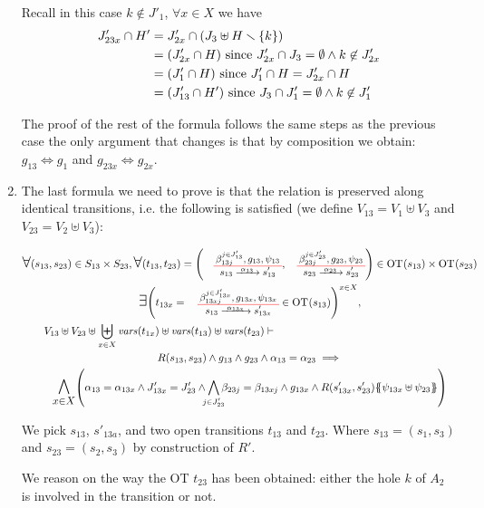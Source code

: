 \documentclass[runningheads]{llncs}
\begin{document}
\begin{enumerate}
Recall in this case $k \notin J'_1$, $\forall x \in X$ we have
\begin{align*}		
J'_{23x} \cap H' & = J'_{2x}  \cap {\left(J_3 \uplus H \smallsetminus{\left\{k\right\}}\right)} \\
& = {\left(J'_{2x}\cap H \right)} \text{ since } J'_{2x}\cap J_3=\emptyset \land k\not\in J'_{2x} \\
& = {\left(J'_1\cap H \right)} \text{ since } J'_1 \cap H = J'_{2x} \cap H\\
& = {\left(J'_{13}\cap H' \right)} \text{ since } J_3\cap J'_1=\emptyset \land k\not\in J_1'
\end{align*}

The proof of the rest of the formula follows the same steps as the previous case the only argument that changes is that by composition we obtain:  $g_{13} \Leftrightarrow g_1$ and
$g_{23x}  \Leftrightarrow g_{2x}$.\\


\item The last formula we need to prove is that the relation is preserved along identical transitions, i.e. the following is satisfied (we define $V_{13} = V_1 \uplus V_3$ and $ V_{23} = V_2\uplus V_3$):

\begin{multline*}
\bigforall \mpar{s_{13}, s_{23}} \in S_{13} \times S_{23}, \bigsymb{\forall} \mpar{t_{13}, t_{23}} = \mpar{\OTx{13}{}{13}{13}, \OTx{23}{}{23}{23}} \in \fOT{s_{13}} \times \fOT{s_{23}} \\ 
\bigsymb{\bigexists} 
\mpar{t_{13x} = \OTx{13}{x}{13x}{13x} \in \fOT{s_{13}}}^{x \in X},\\
 V_{13} \uplus V_{23} \uplus  \biguplus_{x\in X}\fvars{t_{1x}}  \uplus \fvars{t_{13}} \uplus \fvars{t_{23}} 
\vdash \hspace{6cm}\\  R\mpar{s_{13}, s_{23}} \wedge 	g_{13} \wedge g_{23} \wedge \alpha_{13} = \alpha_{23} 
\implies \\
\bigsymb{\bigwedge_{x\in X}}
\mpar{
 \alpha_{13}=\alpha_{1 3x} \land
J'_{13x}  = J'_{23}  \land \bigwedge_\subbox{j \in  J'_{23}} \beta_{23j} = \beta_{13xj}\land g_{1 3x} \land
 R\mpar{s'_{1 3x}, s'_{23}}\psubst{\psi_{1 3x} \uplus \psi_{23}}}
\end{multline*}

We pick $s_{13}$, $s'_{13a}$, and two open transitions $t_{13}$ and $t_{23}$.
Where $s_{13}=(s_1,s_3)$ and $s_{23}=(s_2,s_3)$ by construction of $R'$.


We reason on the way the OT $t_{23}$ has been obtained: either the hole $k$ of $A_2$ is involved in the transition or not.


\end{enumerate}
\end{document}
